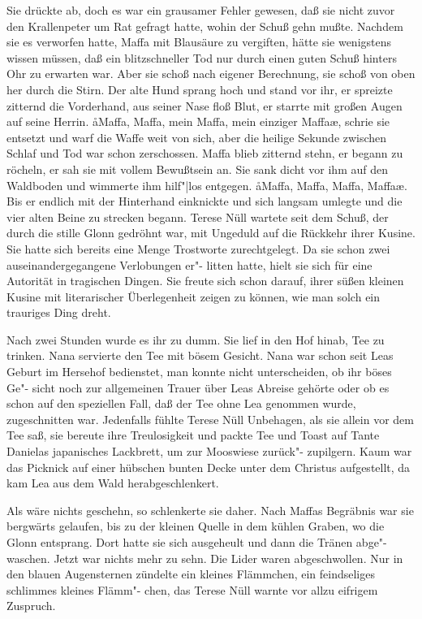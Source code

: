 Sie drückte ab, doch es war ein grausamer Fehler gewesen,
daß sie nicht zuvor den Krallenpeter um Rat gefragt hatte,
wohin der Schuß gehn mußte. Nachdem sie es verworfen
hatte, Maffa mit Blausäure zu vergiften, hätte sie wenigstens
wissen müssen, daß ein blitzschneller Tod nur durch einen guten
Schuß hinters Ohr zu erwarten war. Aber sie schoß nach eigener
Berechnung, sie schoß von oben her durch die Stirn. Der alte
Hund sprang hoch und stand vor ihr, er spreizte zitternd die
Vorderhand, aus seiner Nase floß Blut, er starrte mit großen
Augen auf seine Herrin. \aa{}Maffa, Maffa, mein Maffa, mein
einziger Maffa\ae{}, schrie sie entsetzt und warf die Waffe weit
von sich, aber die heilige Sekunde zwischen Schlaf und Tod
war schon zerschossen. Maffa blieb zitternd stehn, er begann
zu röcheln, er sah sie mit vollem Bewußtsein an. Sie sank
dicht vor ihm auf den Waldboden und wimmerte ihm hilf"|los
entgegen. \aa{}Maffa, Maffa, Maffa, Maffa\ae{}. Bis er endlich mit
der Hinterhand einknickte und sich langsam umlegte und die
vier alten Beine zu strecken begann.
\abstand{}
Terese Nüll wartete seit dem Schuß, der durch die stille Glonn
gedröhnt war, mit Ungeduld auf die Rückkehr ihrer Kusine.
Sie hatte sich bereits eine Menge Trostworte zurechtgelegt.
Da sie schon zwei auseinandergegangene Verlobungen er"-%
litten hatte, hielt sie sich für eine Autorität in tragischen
Dingen. Sie freute sich schon darauf, ihrer süßen kleinen
Kusine mit literarischer Überlegenheit zeigen zu können,
wie man solch ein trauriges Ding dreht.

Nach zwei Stunden wurde es ihr zu dumm. Sie lief in den
Hof hinab, Tee zu trinken. Nana servierte den Tee mit bösem
Gesicht. Nana war schon seit Leas Geburt im Hersehof
bedienstet, man konnte nicht unterscheiden, ob ihr böses Ge"-%
sicht noch zur allgemeinen Trauer über Leas Abreise gehörte
oder ob es schon auf den speziellen Fall, daß der Tee ohne
Lea genommen wurde, zugeschnitten war. Jedenfalls fühlte
Terese Nüll Unbehagen, als sie allein vor dem Tee saß, sie
bereute ihre Treulosigkeit und packte Tee und Toast auf Tante
Danielas japanisches Lackbrett, um zur Mooswiese zurück"-%
zupilgern. Kaum war das Picknick auf einer hübschen bunten
Decke unter dem Christus aufgestellt, da kam Lea aus dem
Wald herabgeschlenkert.

Als wäre nichts geschehn, so schlenkerte sie daher. Nach Maffas
Begräbnis war sie bergwärts gelaufen, bis zu der kleinen
Quelle in dem kühlen Graben, wo die Glonn entsprang.
Dort hatte sie sich ausgeheult und dann die Tränen abge"-%
waschen. Jetzt war nichts mehr zu sehn. Die Lider waren
abgeschwollen. Nur in den blauen Augensternen zündelte ein
kleines Flämmchen, ein feindseliges schlimmes kleines Flämm"-%
chen, das Terese Nüll warnte vor allzu eifrigem Zuspruch.

